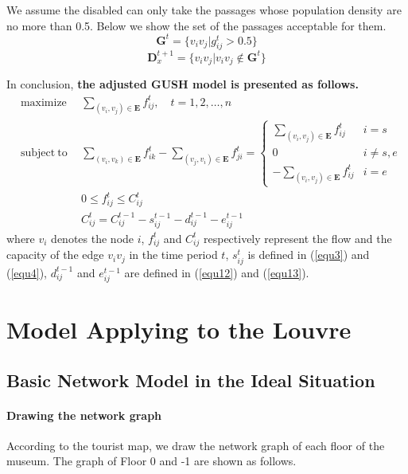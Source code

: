 \documentclass[a4paper,12pt]{article}
\begin{document}
We assume the disabled can only take the passages whose population density are no more than 0.5. Below we show the set of the passages acceptable for them.
\begin{equation}
\label{equ14}
    \bm{G}^t=\{v_iv_j|g^t_{ij}>0.5\}
\end{equation}
\begin{equation}
\label{equ16}
    \bm{D}^{t+1}_x=\{v_iv_j|v_iv_j\notin \bm{G}^t\}
\end{equation}

In conclusion, \textbf{the adjusted GUSH model is presented as follows.}
\begin{eqnarray}
\label{equ18}
 & \textrm{maximize} &               \ \ 
 \sum \limits_{(v_i,v_j)\in \bm{E}} f^t_{ij},\quad t=1, 2, \ldots,n
 \nonumber
 \\
 & \textrm{subject}\ \textrm{to} &    \ \ 
\sum_{(v_i,v_k) \in  \bm{E}}f^t_{ik} - \sum_{(v_j,v_i)\in  \bm{E}}f^t_{ji}= 
\left\{\begin{matrix}
\sum\limits_{(v_i,v_j) \in  \bm{E}}f^t_{ij} & i=s\\ 
0 & i \neq s,e\\ 
-\sum\limits_{(v_i,v_j) \in  \bm{E}}f^t_{ij} & i=e
\end{matrix}\right.
\\
 &   &  \ \  
 0\leq f^t_{ij}\leq C^t_{ij} \nonumber
 \\
 &  & \ \ 
 C^t_{ij}=C^{t-1}_{ij}-s^{t-1}_{ij}-d^{t-1}_{ij}-e^{t-1}_{ij} \nonumber
\end{eqnarray}
where $v_i$ denotes the node $i$,  $f^t_{ij}$ and $C^t_{ij}$ respectively represent the flow and the capacity of the edge $v_iv_j$ in the time period $t$, $s^{t}_{ij}$ is defined in (\ref{equ3}) and (\ref{equ4}), $d^{t-1}_{ij}$ and $e^{t-1}_{ij}$ are defined in (\ref{equ12}) and (\ref{equ13}).

\section{Model Applying to the Louvre}
\subsection{Basic Network Model in the Ideal Situation}
\paragraph{Drawing the network graph} According to the tourist map, we draw the network graph of each floor of the museum. The graph of Floor 0 and -1 are shown as follows.
\end{document}
